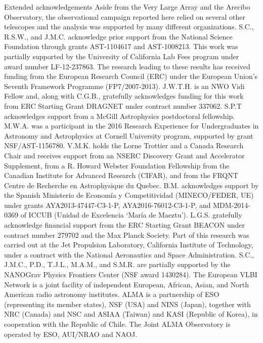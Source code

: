 \documentclass{nature_frb}
\begin{document}
\begin{addendum}

\item[Extended acknowledgements]
Aside from the Very Large Array and the Arecibo Observatory, the observational campaign reported here relied on several other telescopes and the analysis was supported by many different organizations.
%
S.C., R.S.W., and J.M.C. acknowledge prior support from the National Science Foundation through grants AST-1104617 and AST-1008213.
This work was partially supported by the University of California Lab Fees program under award number LF-12-237863.
The research leading to these results has received funding from the European Research Council (ERC) under the European Union's Seventh Framework Programme (FP7/2007-2013).  J.W.T.H. is an NWO Vidi Fellow and, along with C.G.B., gratefully acknowledges funding for this work from ERC Starting Grant DRAGNET under contract number 337062.
S.P.T acknowledges support from a McGill Astrophysics postdoctoral fellowship.
M.W.A. was a participant in the 2016 Research Experience for Undergraduates in Astronomy and Astrophysics at Cornell University program, supported by grant NSF/AST-1156780.
V.M.K. holds the Lorne Trottier and a Canada Research Chair and receives support from an NSERC Discovery Grant and Accelerator Supplement, from a R. Howard Webster Foundation Fellowship from the Canadian Institute for Advanced Research (CIFAR), and from the FRQNT Centre de Recherche en Astrophysique du Quebec.
B.M. acknowledges support by the Spanish Ministerio de Econom\'ia y Competitividad (MINECO/FEDER, UE) under grants AYA2013-47447-C3-1-P, AYA2016-76012-C3-1-P, and MDM-2014-0369 of ICCUB (Unidad de Excelencia `Mar\'ia de Maeztu').
L.G.S. gratefully acknowledge financial support from the ERC Starting Grant BEACON under contract number 279702 and the Max Planck Society.
Part of this research was carried out at the Jet Propulsion Laboratory, California Institute of Technology, under a contract with the National Aeronautics and Space Administration.
S.C., J.M.C., P.D., T.J.L., M.A.M., and S.M.R. are partially supported by the NANOGrav Physics Frontiers Center (NSF award 1430284).
%
The European VLBI Network is a joint facility of independent European, African, Asian, and North American radio astronomy institutes.
ALMA is a partnership of ESO (representing its member states), NSF (USA) and NINS (Japan), together with NRC (Canada) and NSC and ASIAA (Taiwan) and KASI (Republic of Korea), in cooperation with the Republic of Chile. The Joint ALMA Observatory is operated by ESO, AUI/NRAO and NAOJ.

\end{addendum}
\end{document}
